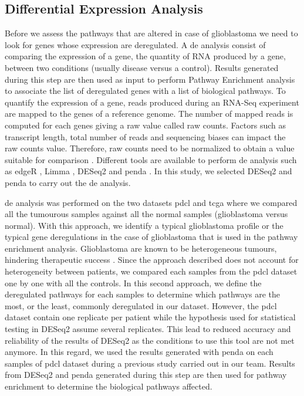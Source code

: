 \subsection{Differential Expression Analysis}

Before we assess the pathways that are altered in case of glioblastoma we need to look for genes whose expression are deregulated.
A \acrfull{de} analysis consist of comparing the expression of a gene, the quantity of RNA produced by a gene, between two conditions (usually disease versus a control).
Results generated during this step are then used as input to perform Pathway Enrichment analysis to associate the list of deregulated genes with a list of biological pathways.
To quantify the expression of a gene, reads produced during an RNA-Seq experiment are mapped to the genes of a reference genome.
The number of mapped reads is computed for each genes giving a raw value called raw counts.
Factors such as transcript length, total number of reads and sequencing biases can impact the raw counts value. 
Therefore, raw counts need to be normalized to obtain a value suitable for comparison \cite*{Conesa2016}.
Different tools are available to perform \acrshort{de} analysis such as edgeR \cite*{Robinson2010}, Limma \cite*{Ritchie2015}, DESeq2 \cite*{Love2014} and \acrshort{penda} \cite*{Richard2020}.
In this study, we selected DESeq2 \cite*{Love2014} and \acrfull{penda} to carry out the \acrshort{de} analysis.

\acrshort{de} analysis was performed on the two datasets \acrshort{pdcl} and \acrshort{tcga} where we compared all the tumourous samples against all the normal samples (glioblastoma versus normal).
With this approach, we identify a typical glioblastoma profile or the typical gene deregulations in the case of glioblastoma that is used in the pathway enrichment analysis.
Glioblastoma are known to be heterogeneous tumours, hindering therapeutic success \cite*{Neftel2019,Delgado-Lopez2016, Quinones2018}.
Since the approach described does not account for heterogeneity between patients, we compared each samples from the \acrshort{pdcl} dataset one by one with all the controls.
In this second approach, we define the deregulated pathways for each samples to determine which pathways are the most, or the least, commonly deregulated in our dataset.
However, the \acrshort{pdcl} dataset contain one replicate per patient while the hypothesis used for statistical testing in DESeq2 assume several replicates.
This lead to reduced accuracy and reliability of the results of DESeq2 as the conditions to use this tool are not met anymore.
In this regard, we used the results generated with \acrshort{penda} on each samples of \acrshort{pdcl} dataset during a previous study carried out in our team.
Results from DESeq2 and \acrshort{penda} generated during this step are then used for pathway enrichment to determine the biological pathways affected.

